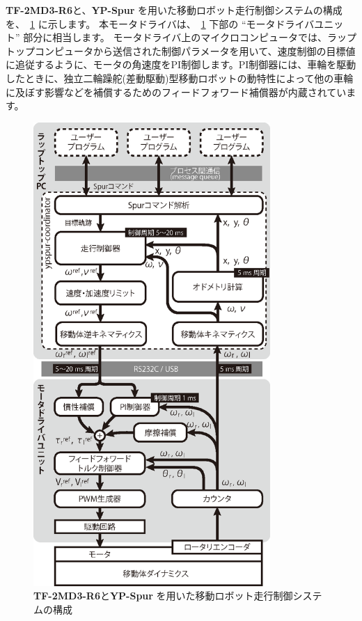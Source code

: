 \documentclass[11pt,a4j,openany,fleqn]{jbook}
\begin{document}
{\bf TF-2MD3-R6}と、{\bf YP-Spur} を用いた移動ロボット走行制御システムの構成を、\figurename~\ref{fig:yp-system} に示します。
本モータドライバは、\figurename~\ref{fig:yp-system} 下部の ``モータドライバユニット'' 部分に相当します。
モータドライバ上のマイクロコンピュータでは、ラップトップコンピュータから送信された制御パラメータを用いて、速度制御の目標値に追従するように、モータの角速度をPI制御します。PI制御器には、車輪を駆動したときに、独立二輪躁舵(差動駆動)型移動ロボットの動特性によって他の車輪に及ぼす影響などを補償するためのフィードフォワード補償器\cite{the:pws_ff_cnt}\cite{the:vehicle_control}が内蔵されています。\par
\begin{figure}[H]
\centering\includegraphics[width=90mm]{system2.eps}
\caption{{\bf TF-2MD3-R6}と{\bf YP-Spur} を用いた移動ロボット走行制御システムの構成}
\label{fig:yp-system}
\end{figure}


\newpage
\end{document}
